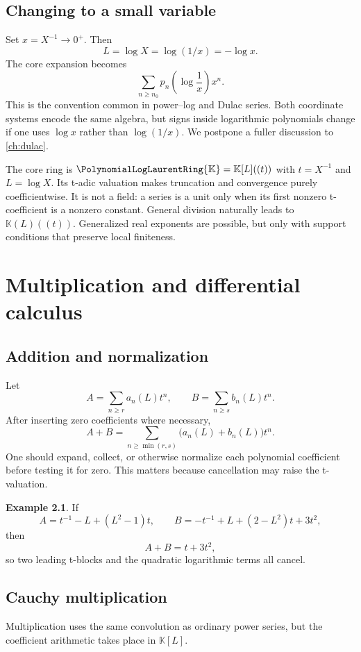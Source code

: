\documentclass[11pt,openany]{book}
\theoremstyle{definition}
\newtheorem{example}{Example}[chapter]
\theoremstyle{plain}
\theoremstyle{remark}
\newcommand{\K}{\mathbb{K}}
\begin{document}
\section{Changing to a small variable}
Set \(x=X^{-1}\to0^+\).  Then
\[
 L=\log X=\log(1/x)=-\log x.
\]
The core expansion becomes
\begin{equation}\label{eq:small-variable-form}
 \sum_{n\ge n_0}p_n\!\left(\log\frac1x\right)x^n.
\end{equation}
This is the convention common in power--log and Dulac series.  Both coordinate
systems encode the same algebra, but signs inside logarithmic polynomials
change if one uses \(\log x\) rather than \(\log(1/x)\).  We postpone a fuller
discussion to \cref{ch:dulac}.

\begin{summarybox}
The core ring is \(\PolynomialLogLaurentRing{\K}=\K[L]((t))\) with \(t=X^{-1}\) and
\(L=\log X\).  Its t-adic valuation makes truncation and convergence purely
coefficientwise.  It is not a field: a series is a unit only when its first
nonzero t-coefficient is a nonzero constant.  General division naturally leads
to \(\K(L)((t))\).  Generalized real exponents are possible, but only with
support conditions that preserve local finiteness.
\end{summarybox}

\chapter{Multiplication and differential calculus}\label{ch:multiplication}

\section{Addition and normalization}
Let
\[
 A=\sum_{n\ge r}a_n(L)t^n,
 \qquad
 B=\sum_{n\ge s}b_n(L)t^n.
\]
After inserting zero coefficients where necessary,
\[
 A+B=\sum_{n\ge\min(r,s)}\bigl(a_n(L)+b_n(L)\bigr)t^n.
\]
One should expand, collect, or otherwise normalize each polynomial coefficient
before testing it for zero.  This matters because cancellation may raise the
t-valuation.

\begin{example}
If
\[
 A=t^{-1}-L+(L^2-1)t,
 \qquad
 B=-t^{-1}+L+(2-L^2)t+3t^2,
\]
then
\[
 A+B=t+3t^2,
\]
so two leading t-blocks and the quadratic logarithmic terms all cancel.
\end{example}

\section{Cauchy multiplication}
Multiplication uses the same convolution as ordinary power series, but the
coefficient arithmetic takes place in \(\K[L]\).
\end{document}
